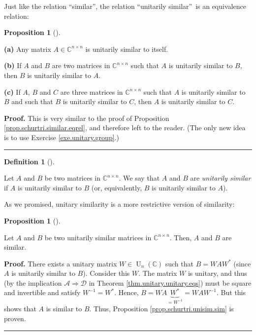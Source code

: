\documentclass[numbers=enddot,12pt,final,onecolumn,notitlepage]{scrartcl}%
\numberwithin{exer}{subsection}
\theoremstyle{definition}
\newtheorem{prop}[theo]{Proposition}
\newenvironment{proposition}[1][]
{\begin{prop}[#1]\begin{leftbar}}
{\end{leftbar}\end{prop}}
\newtheorem{defi}[theo]{Definition}
\newenvironment{definition}[1][]
{\begin{defi}[#1]\begin{leftbar}}
{\end{leftbar}\end{defi}}
\newenvironment{proof}[1][Proof]{\noindent\textbf{#1.} }{\ \rule{0.5em}{0.5em}}
\begin{document}
Just like the relation \textquotedblleft similar\textquotedblright, the
relation \textquotedblleft unitarily similar\textquotedblright\ is an
equivalence relation:

\begin{proposition}
\label{prop.schurtri.unisim.eqrel}\textbf{(a)} Any matrix $A\in\mathbb{C}%
^{n\times n}$ is unitarily similar to itself.

\textbf{(b)} If $A$ and $B$ are two matrices in $\mathbb{C}^{n\times n}$ such
that $A$ is unitarily similar to $B$, then $B$ is unitarily similar to $A$.

\textbf{(c)} If $A$, $B$ and $C$ are three matrices in $\mathbb{C}^{n\times
n}$ such that $A$ is unitarily similar to $B$ and such that $B$ is unitarily
similar to $C$, then $A$ is unitarily similar to $C$.
\end{proposition}

\begin{proof}
This is very similar to the proof of Proposition
\ref{prop.schurtri.similar.eqrel}, and therefore left to the reader. (The only
new idea is to use Exercise \ref{exe.unitary.group}.)
\end{proof}

\begin{definition}
Let $A$ and $B$ be two matrices in $\mathbb{C}^{n\times n}$. We say that $A$
and $B$ are \emph{unitarily similar} if $A$ is unitarily similar to $B$ (or,
equivalently, $B$ is unitarily similar to $A$).
\end{definition}

As we promised, unitary similarity is a more restrictive version of similarity:

\begin{proposition}
\label{prop.schurtri.unisim.sim}Let $A$ and $B$ be two unitarily similar
matrices in $\mathbb{C}^{n\times n}$. Then, $A$ and $B$ are similar.
\end{proposition}

\begin{proof}
There exists a unitary matrix $W\in\operatorname*{U}\nolimits_{n}\left(
\mathbb{C}\right)  $ such that $B=WAW^{\ast}$ (since $A$ is unitarily similar
to $B$). Consider this $W$. The matrix $W$ is unitary, and thus (by the
implication $\mathcal{A}\Longrightarrow\mathcal{D}$ in Theorem
\ref{thm.unitary.unitary.eqs}) must be square and invertible and satisfy
$W^{-1}=W^{\ast}$. Hence, $B=WA\underbrace{W^{\ast}}_{=W^{-1}}=WAW^{-1}$. But
this shows that $A$ is similar to $B$. Thus, Proposition
\ref{prop.schurtri.unisim.sim} is proven.
\end{proof}
\end{document}
